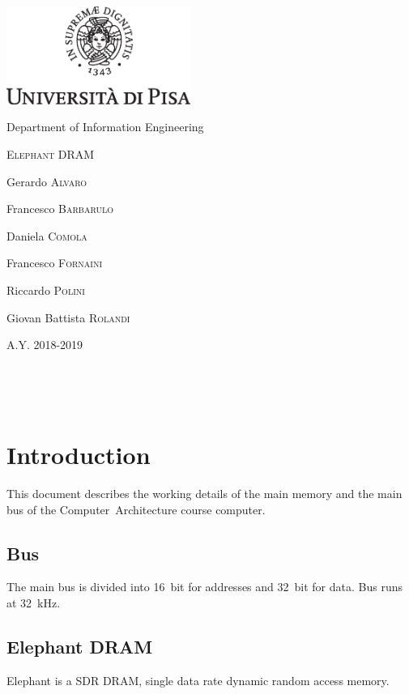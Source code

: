 \documentclass[a4paper,12pt]{article}
\newcommand{\memoryname}{Elephant}
\begin{document}

{
  \begin{titlepage}
  	\centering
  	\includegraphics[width=6cm]{img/unipi.eps}\par
    \vspace{1.5cm}
    {\Large Department of Information Engineering \par}
  	\vspace{1.5cm}
  	{\huge\textsc{\memoryname{} DRAM}\par}
  	\vspace{2cm}
  	Gerardo \textsc{Alvaro}\par
  	Francesco \textsc{Barbarulo}\par
    Daniela \textsc{Comola}\par
    Francesco \textsc{Fornaini}\par
    Riccardo \textsc{Polini}\par
    Giovan Battista \textsc{Rolandi}

  	\vfill

  	{\large A.Y. 2018-2019\par}
  \end{titlepage}
}

\clearpage
~
\clearpage

\tableofcontents

\clearpage
~
\clearpage

\section{Introduction}

This document describes the working details of the main memory and the main bus of the Computer~Architecture course computer.

\subsection{Bus}
The main bus is divided into 16~bit for addresses and 32~bit for data.
Bus runs at 32~kHz.

\subsection{\memoryname{} DRAM}
\memoryname{} is a SDR DRAM, single data rate dynamic random access memory.
\end{document}
